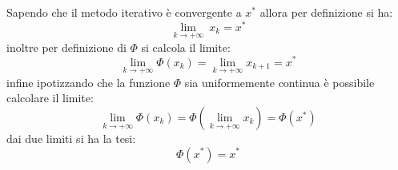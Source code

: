 Sapendo che il metodo iterativo è convergente a \( x^* \) allora per definizione si ha:
 \[
	\lim_{k \to +\infty}\ x_k = x^*
\]
 inoltre per definizione di \( \Phi \) si calcola il limite:
\[
    \lim_{k \to +\infty} \Phi(x_k) = \lim_{k \to +\infty} x_{k+1} = x^*
\]
 infine ipotizzando che la funzione \( \Phi \) sia uniformemente continua è possibile calcolare il limite:
\[
    \lim_{k \to +\infty} \Phi(x_k) = \Phi(\lim_{k \to +\infty} x_k) = \Phi(x^*)
\]
 dai due limiti si ha la tesi:
\[
    \Phi(x^*) = x^* 
\]